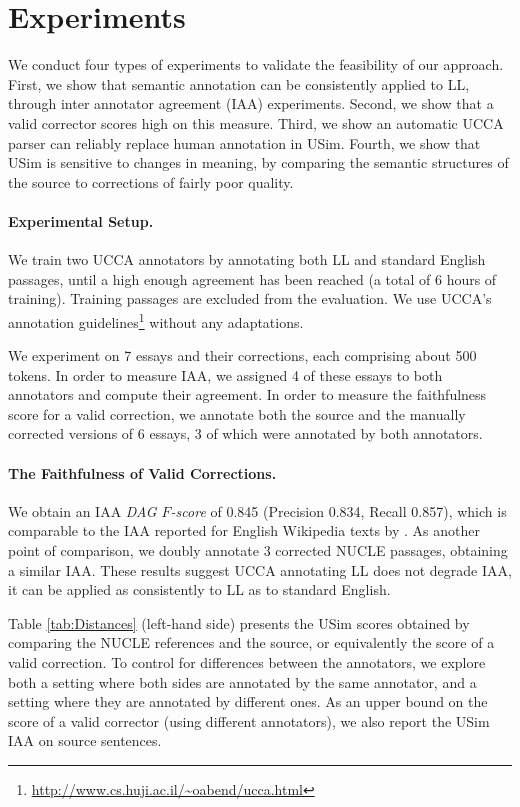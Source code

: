 \documentclass[a4paper, 11pt]{article}
\begin{document}
\section{Experiments}

We conduct four types of experiments to validate the feasibility of our approach.
First, we show that semantic annotation can be consistently applied to 
LL, through inter annotator agreement (IAA) experiments.
Second, we show that a valid corrector scores high on this measure.
Third, we show an automatic UCCA parser can reliably replace human annotation in {\sc USim}.
Fourth, we show that {\sc USim} is sensitive to changes in meaning, 
by comparing the semantic structures of the source to corrections of fairly poor quality.


\paragraph{Experimental Setup.}
We train two UCCA annotators by annotating both LL and standard English
passages, until a high enough agreement has been reached (a total of 6 hours of training).
Training passages are excluded from the evaluation.
We use UCCA's annotation
guidelines\footnote{\url{http://www.cs.huji.ac.il/~oabend/ucca.html}}
without any adaptations.

We experiment on 7 essays and their corrections, each comprising about 500 tokens.
In order to measure IAA, we assigned 4 of these essays to both annotators
and compute their agreement.
In order to measure the faithfulness score for a valid correction,
we annotate both the source
and the manually corrected versions of 6 essays,
3 of which were annotated by both annotators.

\paragraph{The Faithfulness of Valid Corrections.}
We obtain an IAA {\it DAG $F$-score} of 0.845
(Precision 0.834, Recall 0.857), which
is comparable to the IAA reported for English Wikipedia texts by \cite{abend2013universal}.
As another point of comparison, we doubly annotate 3 corrected
NUCLE \cite{dahlmeier2013building} passages, obtaining a similar IAA.
These results suggest UCCA annotating LL does not degrade IAA, 
it can be applied as consistently to LL as to standard English.

Table \ref{tab:Distances} (left-hand side) presents the {\sc USim} scores obtained by comparing 
the NUCLE references and the source, or equivalently the score of a valid correction.
To control for differences between the annotators, we explore both
a setting where both sides are annotated by the same annotator,
and a setting where they are annotated by different ones.
As an upper bound on the score of a valid corrector (using different annotators),
we also report the {\sc USim} IAA on source sentences. 
\end{document}
